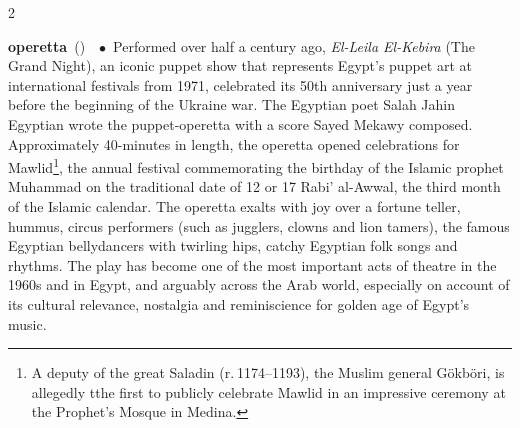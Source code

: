\documentclass[10pt,a4paper,twoside]{article} %
\newcommand{\entry}[4]{\markboth{#1}{#1}\textbf{#1}\ {(#2)}\ \textit{#3}\ $\bullet$\ {#4}}  %
\begin{document}
\begin{multicols}{2}

\entry{operetta} {} {} {Performed over half a century ago, \emph{El-Leila El-Kebira} (The Grand Night), an iconic puppet show that represents Egypt’s puppet art at international festivals from 1971, celebrated its 50th anniversary just a year before the beginning of the Ukraine war. The Egyptian poet Salah Jahin  Egyptian wrote the puppet-operetta with a score Sayed Mekawy composed. Approximately 40-minutes in length, the operetta opened celebrations for Mawlid\footnote{A deputy of the great Saladin (r. 1174–1193), the Muslim general Gökböri, is allegedly tthe first to publicly celebrate Mawlid in an impressive ceremony at the Prophet's Mosque in Medina.}, the annual festival commemorating the birthday of the Islamic prophet Muhammad on the traditional date of 12 or 17 Rabi' al-Awwal, the third month of the Islamic calendar. The operetta exalts with joy over a fortune teller, hummus, circus performers (such as jugglers, clowns and lion tamers), the famous Egyptian bellydancers with twirling hips, catchy Egyptian folk songs and rhythms. The play has become one of the most important acts of theatre in the 1960s and in Egypt, and arguably across the Arab world, especially on account of its cultural relevance, nostalgia and reminiscience for golden age of Egypt's music.
}


\end{multicols}
\end{document}
